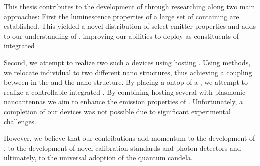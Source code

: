 	This thesis contributes to the development of \spss through researching \sivs along two main approaches: First the luminescence properties of a large set of \nds containing \sivs are established. This yielded a novel distribution of select emitter properties and adds to our understanding of \sivs, improving our abilities to deploy \sivs as constituents of integrated \sps.

	Second, we attempt to realize two such a devices using \nds hosting \sivs. Using \pp methods, we relocate individual \nds to two different nano structures, thus achieving a coupling between \sivs in the \nd and the nano structure. By placing a \nd ontop of a \vcsel, we attempt to realize a controllable integrated \sps. By combining \nds hosting several \sivs with plasmonic nanoantennas we aim to enhance the emission properties of \sivs. Unfortunately, a completion of our devices was not possible due to significant experimental challenges.

	However, we believe that our contributions add momentum to the development of \sps, to the development of novel calibration standards and photon detectors and ultimately, to the universal adoption of the quantum candela.


\vfill
